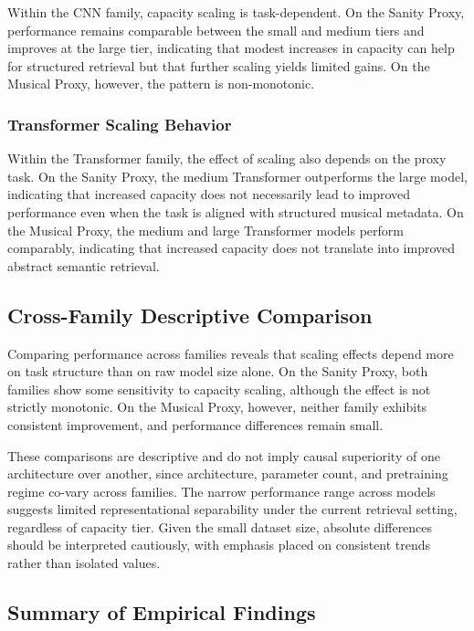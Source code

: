 \documentclass{article}
\begin{document}
Within the CNN family, capacity scaling is task-dependent. On the Sanity Proxy, performance remains comparable between the small and medium tiers and improves at the large tier, indicating that modest increases in capacity can help for structured retrieval but that further scaling yields limited gains. On the Musical Proxy, however, the pattern is non-monotonic.

\subsubsection{Transformer Scaling Behavior}

Within the Transformer family, the effect of scaling also depends on the proxy task. On the Sanity Proxy, the medium Transformer outperforms the large model, indicating that increased capacity does not necessarily lead to improved performance even when the task is aligned with structured musical metadata. On the Musical Proxy, the medium and large Transformer models perform comparably, indicating that increased capacity does not translate into improved abstract semantic retrieval.

\subsection{Cross-Family Descriptive Comparison}

Comparing performance across families reveals that scaling effects depend more on task structure than on raw model size alone. On the Sanity Proxy, both families show some sensitivity to capacity scaling, although the effect is not strictly monotonic. On the Musical Proxy, however, neither family exhibits consistent improvement, and performance differences remain small.

These comparisons are descriptive and do not imply causal superiority of one architecture over another, since architecture, parameter count, and pretraining regime co-vary across families. The narrow performance range across models suggests limited representational separability under the current retrieval setting, regardless of capacity tier. Given the small dataset size, absolute differences should be interpreted cautiously, with emphasis placed on consistent trends rather than isolated values.

\subsection{Summary of Empirical Findings}
\end{document}
